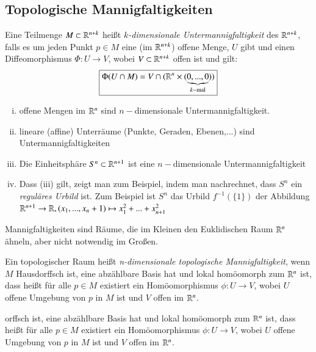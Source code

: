 \documentclass[a4paper,10pt]{scrartcl}
\begin{document}
\subsection{Topologische Mannigfaltigkeiten}
\begin{df}
Eine Teilmenge $M\subset \mathbb{R}^{n+k}$ heißt \emph{$k$-dimensionale Untermannigfaltigkeit} des $\mathbb{R}^{n+k}$, falls es um jeden Punkt $p\in M$ eine (im $\mathbb{R}^{n+k}$) offene Menge, $U$ gibt und einen Diffeomorphismus $\Phi: U\to V$, wobei $V\subset \mathbb{R}^{n+k}$ offen ist und gilt:
\fixme[fig30]
\[
 \boxed{\Phi(U\cap M)=V\cap(\mathbb{R}^n\times(\underbrace{0,...,0}_{k-\text{mal}}))}
\]
\end{df}
\begin{exs*}
 \begin{enumerate}[(i)]
  \item offene Mengen im $\mathbb{R}^n$ sind $n-$dimensionale Untermannigfaltigkeit.
  \item lineare (affine) Unterräume (Punkte, Geraden, Ebenen,...) sind Untermannigfaltigkeiten
  \item Die Einheitsphäre $S^n\subset \mathbb{R}^{n+1}$ ist eine $n-$dimensionale Untermannigfaltigkeit
  \item Dass (iii) gilt, zeigt man zum Beispiel, indem man nachrechnet, dass $S^n$ ein \emph{reguläres Urbild} ist. Zum Beispiel ist $S^n$ das Urbild $f^{-1}(\{1\})$ der Abbildung $\mathbb{R}^{n+1}\to \mathbb{R}, (x_1,...,x_n+1)\mapsto x_1^2+...+x_{n+1}^2$
 \end{enumerate}
Mannigfaltigkeiten sind Räume, die im Kleinen den Euklidischen Raum $\mathbb{R}^n$ ähneln, aber nicht notwendig im Großen.
\end{exs*}
\begin{df}
 Ein topologischer Raum heißt \emph{n-dimensionale topologische Mannigfaltigkeit}, wenn $M$ Hausdorffsch ist, eine abzählbare Basis hat und lokal homöomorph zum $\mathbb{R}^n$ ist, dass heißt für alle $p\in M$ existiert ein Homöomorphismus $\phi:U\to V$, wobei $U$ offene Umgebung von $p$ in $M$ ist und $V$ offen im $\mathbb{R}^n$.
\end{df}orffsch ist, eine abzählbare Basis hat und lokal homöomorph zum $\mathbb{R}^n$ ist, dass heißt für alle $p\in M$ existiert ein Homöomorphismus $\phi:U\to V$, wobei $U$ offene Umgebung von $p$ in $M$ ist und $V$ offen im $\mathbb{R}^n$.
\fixme[fig31]
\end{document}
